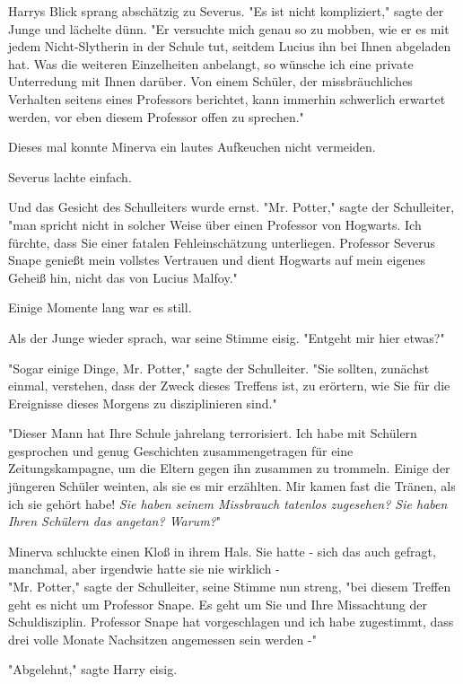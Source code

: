 {Harrys Blick sprang abschätzig zu Severus. "Es ist nicht kompliziert," sagte der Junge und lächelte dünn. "Er versuchte mich genau so zu mobben, wie er es mit jedem Nicht-Slytherin in der Schule tut, seitdem Lucius ihn bei Ihnen abgeladen hat. Was die weiteren Einzelheiten anbelangt, so wünsche ich eine private Unterredung mit Ihnen darüber. Von einem Schüler, der missbräuchliches Verhalten seitens eines Professors berichtet, kann immerhin schwerlich erwartet werden, vor eben diesem Professor offen zu sprechen."

Dieses mal konnte Minerva ein lautes Aufkeuchen nicht vermeiden.

Severus lachte einfach.

Und das Gesicht des Schulleiters wurde ernst. "Mr. Potter," sagte der Schulleiter, "man spricht nicht in solcher Weise über einen Professor von Hogwarts. Ich fürchte, dass Sie einer fatalen Fehleinschätzung unterliegen. Professor Severus Snape genießt mein vollstes Vertrauen und dient Hogwarts auf mein eigenes Geheiß hin, nicht das von Lucius Malfoy."

Einige Momente lang war es still.

Als der Junge wieder sprach, war seine Stimme eisig. "Entgeht mir hier etwas?"

"Sogar einige Dinge, Mr. Potter," sagte der Schulleiter. "Sie sollten, zunächst einmal, verstehen, dass der Zweck dieses Treffens ist, zu erörtern, wie Sie für die Ereignisse dieses Morgens zu disziplinieren sind."

"Dieser Mann hat Ihre Schule jahrelang terrorisiert. Ich habe mit Schülern gesprochen und genug Geschichten zusammengetragen für eine Zeitungskampagne, um die Eltern gegen ihn zusammen zu trommeln. Einige der jüngeren Schüler weinten, als sie es mir erzählten. Mir kamen fast die Tränen, als ich sie gehört habe! \emph{Sie haben seinem Missbrauch tatenlos zugesehen? Sie haben Ihren Schülern das angetan? Warum?}"

Minerva schluckte einen Kloß in ihrem Hals. Sie hatte - sich das auch gefragt, manchmal, aber irgendwie hatte sie nie wirklich -\\ "Mr. Potter," sagte der Schulleiter, seine Stimme nun streng, "bei diesem Treffen geht es nicht um Professor Snape. Es geht um Sie und Ihre Missachtung der Schuldisziplin. Professor Snape hat vorgeschlagen und ich habe zugestimmt, dass drei volle Monate Nachsitzen angemessen sein werden -"

"Abgelehnt," sagte Harry eisig.

}

